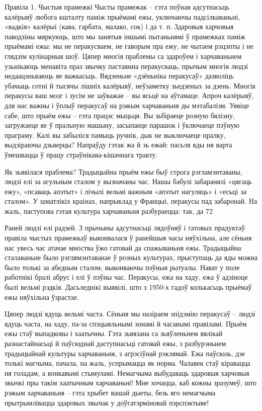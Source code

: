 Правіла 1. Чыстыя прамежкі
Чысты прамежак – гэта поўная адсутнасьць калёрыяў любога кшталту паміж прыёмамі ежы, уключаючы падсілкаваньні, «вадкія» калёрыі (кава, гарбата, малако, сок) і да т. п. Здаровыя харчовыя паводзіны мяркуюць, што мы занятыя іншымі пытаньнямі ў прамежках паміж прыёмамі ежы: мы не перакусваем, не гаворым пра ежу, не чытаем рэцэпты і не глядзім кулінарныя шоў. Цяпер многія праблемы са здароўем і харчаваньнем узьнікаюць менавіта праз звычку пастаянна перакусваць, прычым многія людзі недаацэньваюць яе важкасьць.
Вядзеньне «дзёньніка перакусаў» дазволіць убачыць сотні й тысячы лішніх калёрыяў, неўзаметку зьедзеных за дзень. Многія перакусы ваш мозг і зусім не заўважае – вы ясьцё на аўтамаце. Апроч калёрыяў, для нас важны і ўплыў перакусаў на рэжым харчаваньня ды мэтабалізм. Уявіце сабе, што прыём ежы – гэта працэс мыцьця. Вы зьбіраеце розную бялізну, загружаеце яе ў пральную машыну, засыпаеце парашок і ўключаеце пэўную праграму. Калі вы забыліся памыць ручнік, дык не выключаеце пралку, выдзіраючы дзьверцы? Напраўду гэтак жа й зь ежай: пасьля яды ня варта ўмешвацца ў працу страўнікава-кішачнага тракту.

Як зьявілася праблема?
Традыцыйна прыём ежы быў строга рэгламэнтаваны, людзі елі за агульным сталом у вызначаны час. Нашы бабулі забаранялі «цягаць ежу», «псаваць апэтыт» і лічылі вельмі важным «апэтыт нагуляць» і «есьці за сталом». У шматлікіх краінах, напрыклад у Францыі, перакусы пад забаронай. На жаль, паступова гэтая культура харчаваньня разбураецца: так, да 72%

Раней людзі елі радзей.
З прычыны адсутнасьці лядоўняў і гатовых прадуктаў правіла чыстых прамежкаў выконвалася ў ранейшыя часы няўхільна, але сёньня нас увесь час атачае мноства ўжо гатовай да спажываньня ежы. Традыцыйна сталаваньне было рэглямэнтаванае ў розных культурах, прыступаць да яды можна было толькі за абедным сталом, выконваючы пэўныя рытуалы. Нават у поле работнікі бралі абрус і елі ў пэўны час. Перакусы, ежа на хаду, ежа ў адзіноце былі вельмі рэдкія. Дасьледнікі выявілі, што з 1950-х гадоў колькасьць прыёмаў ежы няўхільна ўзрастае.

Цяпер людзі ядуць вельмі часта.
Сёньня мы назіраем эпідэмію перакусаў – людзі ядуць часта, на хаду, па-за спэцыяльнымі зонамі й часавымі правіламі. Прыём ежы стаў выпадковы і хаатычны. Гэта зьвязана са зьяўленьнем вялікай разнастайнасьці й паўсюднай даступнасьці гатовай ежы, з разбурэньнем традыцыйнай культуры харчаваньня, з агрэсіўнай рэклямай. Ежа паўсюль, дзе толькі магчыма, пачала, на жаль, успрымацца як норма. Чалавек стаў кіравацца ня голадам, а вонкавымі стымуламі. Немагчыма выбудаваць здаровыя харчовыя звычкі пры такім хаатычным харчаваньні! Мне хочацца, каб кожны зразумеў, што рэжым харчаваньня – гэта хрыбет вашай дыеты, безь яго немагчыма прытрымлівацца здаровых звычак у доўгатэрміновай пэрспэктыве!

